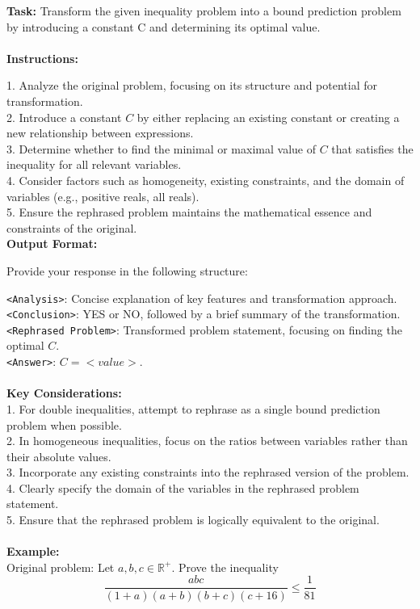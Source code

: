 \begin{textcolorbox}
\textbf{Task:} Transform the given inequality problem into a bound prediction problem by introducing a constant C and determining its optimal value.
\\\\
\textbf{Instructions:}

1. Analyze the original problem, focusing on its structure and potential for transformation. \\
2. Introduce a constant $C$ by either replacing an existing constant or creating a new relationship between expressions. \\
3. Determine whether to find the minimal or maximal value of $C$ that satisfies the inequality for all relevant variables. \\
4. Consider factors such as homogeneity, existing constraints, and the domain of variables (e.g., positive reals, all reals). \\
5. Ensure the rephrased problem maintains the mathematical essence and constraints of the original. \\

\textbf{Output Format:}

Provide your response in the following structure:

\texttt{<Analysis>}: Concise explanation of key features and transformation approach. \\
\texttt{<Conclusion>}: YES or NO, followed by a brief summary of the transformation. \\
\texttt{<Rephrased Problem>}: Transformed problem statement, focusing on finding the optimal $C$. \\
\texttt{<Answer>}: $C = <value>$.
\\\\
\textbf{Key Considerations:} \\
1. For double inequalities, attempt to rephrase as a single bound prediction problem when possible. \\
2. In homogeneous inequalities, focus on the ratios between variables rather than their absolute values. \\
3. Incorporate any existing constraints into the rephrased version of the problem. \\
4. Clearly specify the domain of the variables in the rephrased problem statement. \\
5. Ensure that the rephrased problem is logically equivalent to the original.
\\\\
\textbf{Example:} \\
Original problem:
Let $a, b, c \in \mathbb{R}^{+}$. Prove the inequality
$$
\frac{a b c}{(1+a)(a+b)(b+c)(c+16)} \leq \frac{1}{81}
$$


\end{textcolorbox}
